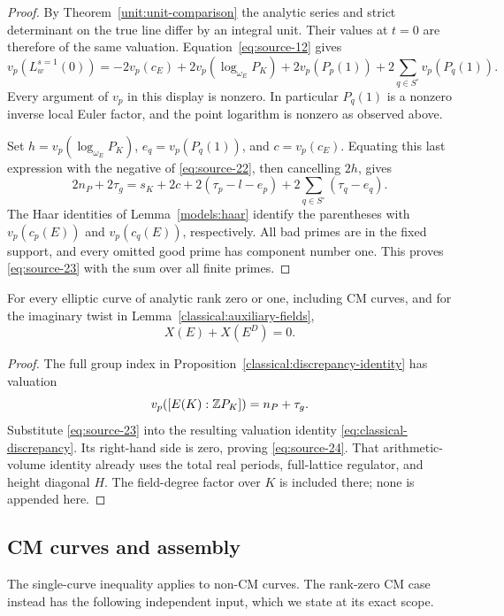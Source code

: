 \begin{proof}
By Theorem~\ref{unit:unit-comparison} the analytic series and
strict determinant on the true line differ by an integral unit.
Their values at $t=0$ are therefore of the same valuation.
Equation~\eqref{eq:source-12} gives
\[
 v_p(L_w^{s=1}(0))
 =-2v_p(c_E)+2v_p(\log_{\omega_E}P_K)
   +2v_p(P_p(1))+2\sum_{q\in S^\circ}v_p(P_q(1)).
\]
Every argument of $v_p$ in this display is nonzero.  In particular $P_q(1)$ is a
nonzero inverse local Euler factor, and the point logarithm is
nonzero as observed above.

Set $h=v_p(\log_{\omega_E}P_K)$, $e_q=v_p(P_q(1))$, and
$c=v_p(c_E)$.  Equating this last expression with the negative
of \eqref{eq:source-22}, then cancelling $2h$, gives
\[
 2n_P+2\tau_g
 =s_K+2c+2(\tau_p-l-e_p)
       +2\sum_{q\in S^\circ}(\tau_q-e_q).
\]
The Haar identities of Lemma~\ref{models:haar} identify the
parentheses with $v_p(c_p(E))$ and $v_p(c_q(E))$, respectively.
All bad primes are in the fixed support, and every omitted good
prime has component number one.  This proves
\eqref{eq:source-23} with the sum over all finite primes.
\end{proof}

\begin{corollary}\label{center:pair-discrepancy}
For every elliptic curve of analytic rank zero or one, including
CM curves, and for the imaginary twist in
Lemma~\ref{classical:auxiliary-fields},
\begin{equation}
                         X(E)+X(E^D)=0.
                         \tag{24}\label{eq:source-24}
\end{equation}
\end{corollary}

\begin{proof}
The full group index in
Proposition~\ref{classical:discrepancy-identity} has valuation
\[
 v_p([E(K):\mathbb Z P_K])=n_P+\tau_g.
\]
Substitute \eqref{eq:source-23} into the resulting valuation
identity \eqref{eq:classical-discrepancy}.  Its right-hand side
is zero, proving \eqref{eq:source-24}.  That arithmetic-volume
identity already uses the total real periods, full-lattice
regulator, and height diagonal $H$.  The field-degree factor
over $K$ is included there; none is appended here.
\end{proof}

\subsection{CM curves and assembly}

The single-curve inequality applies to non-CM curves.  The
rank-zero CM case instead has the following independent input,
which we state at its exact scope.

